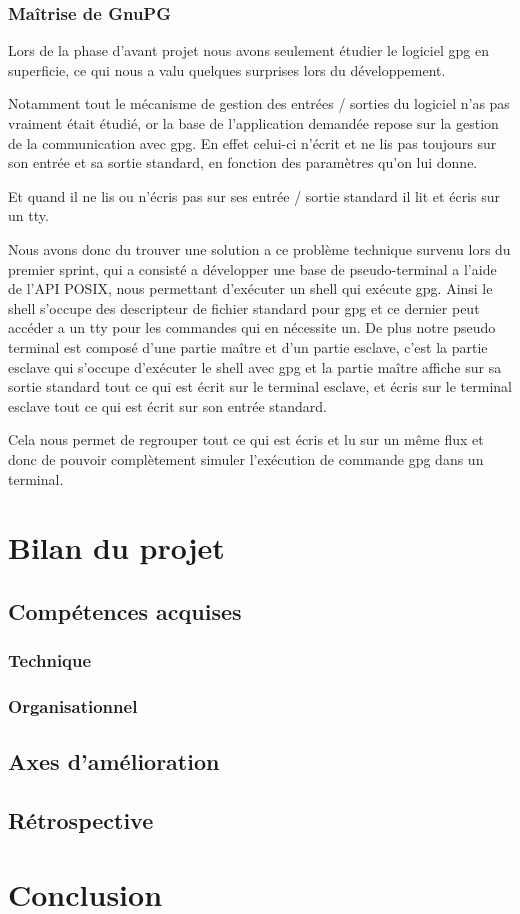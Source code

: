 \documentclass{../res/univ-projet}
\begin{document}
    \subsubsection{Maîtrise de GnuPG}
    
      Lors de la phase d'avant projet nous avons seulement étudier le logiciel gpg
      en superficie, ce qui nous a valu quelques surprises lors du développement.

      Notamment tout le mécanisme de gestion des entrées / sorties du logiciel n'as pas vraiment était
      étudié, or la base de l'application demandée repose sur la gestion de la communication avec
      gpg.
      En effet celui-ci n'écrit et ne lis pas toujours sur son entrée et sa sortie standard,
      en fonction des paramètres qu'on lui donne.

      Et quand il ne lis ou n'écris pas sur ses entrée / sortie standard il lit et écris sur un
      tty.

      Nous avons donc du trouver une solution a ce problème technique survenu lors du premier sprint,
      qui a consisté a développer une base de pseudo-terminal a l'aide de l'API POSIX, nous permettant
      d'exécuter un shell qui exécute gpg.
      Ainsi le shell s'occupe des descripteur de fichier standard pour gpg et ce dernier peut accéder a un tty
      pour les commandes qui en nécessite un.
      De plus notre pseudo terminal est composé d'une partie maître et d'un partie esclave,
      c'est la partie esclave qui s'occupe d'exécuter le shell avec gpg et la partie maître affiche
      sur sa sortie standard tout ce qui est écrit sur le terminal esclave, 
      et écris sur le terminal esclave tout ce qui est écrit sur son entrée standard.

      Cela nous permet de regrouper tout ce qui est écris et lu sur un même flux et donc de pouvoir
      complètement simuler l'exécution de commande gpg dans un terminal.
  

\section{Bilan du projet}
  \subsection{Compétences acquises}
    \subsubsection{Technique}
    \subsubsection{Organisationnel}
  \subsection{Axes d'amélioration}
  \subsection{Rétrospective}

\section{Conclusion}
\end{document}
